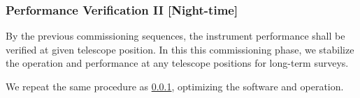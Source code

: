 \subsubsection{Performance Verification II [Night-time]}\label{secflow:PV2}

By the previous commissioning sequences, the instrument performance shall be verified at given telescope position.
In this this commissioning phase, we stabilize the operation and performance at any telescope positions for long-term surveys.

We repeat the same procedure as \ref{secflow:PV2}, optimizing the software and operation.
